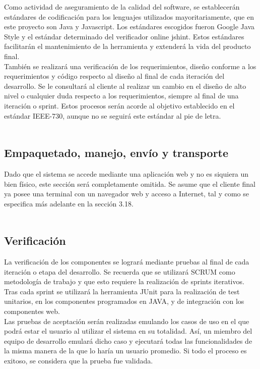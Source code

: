\documentclass[a4paper]{article}
\newcommand\tab[1][0.55cm]{\hspace*{#1}}
\begin{document}
{    Como actividad de aseguramiento de la calidad del software, se establecerán estándares de codificación para los lenguajes utilizados mayoritariamente, que en este proyecto son Java y Javascript. Los estándares escogidos fueron Google Java Style y el estándar determinado del verificador online \textrm{jshint}. Estos estándares facilitarán el mantenimiento de la herramienta y extenderá la vida del producto final.\\
    
    También se realizará una verificación de los requerimientos, diseño conforme a los requerimientos y código respecto al diseño al final de cada iteración del desarrollo. Se le consultará al cliente al realizar un cambio en el diseño de alto nivel o cualquier duda respecto a los requerimientos, siempre al final de una iteración o sprint. Estos procesos serán acorde al objetivo establecido en el  estándar IEEE-730, aunque no se seguirá este estándar al pie de letra. \\ \\


\color{Blue}
\subsection{Empaquetado, manejo, envío y transporte}
\color{black}
\justify 

	\tab Dado que el sistema se accede mediante una aplicación web y no es siquiera un bien físico, este sección será completamente omitida. Se asume que el cliente final ya posee una terminal con un navegador web y acceso a Internet, tal y como se especifica más adelante en la sección 3.18.  \\ \\

\color{Blue}
\subsection{Verificación}
\color{black}
\justify 

	\tab La verificación de los componentes se logrará mediante pruebas al final de cada iteración o etapa del desarrollo. Se recuerda que se utilizará SCRUM como metodología de trabajo y que esto requiere la realización de sprints iterativos. Tras cada sprint se utilizará la herramienta JUnit para la realización de test unitarios, en los componentes programados en JAVA, y de integración con los componentes web. \\
    
    Las pruebas de aceptación serán realizadas emulando los casos de uso en el que podrá estar el usuario al utilizar el sistema en su totalidad. Así, un miembro del equipo de desarrollo emulará dicho caso y ejecutará todas las funcionalidades de la misma manera de la que lo haría un usuario promedio. Si todo el proceso es exitoso, se considera que la prueba fue validada. \\ \\

}
\end{document}
